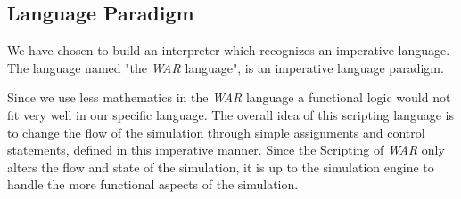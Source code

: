 \subsection{Language Paradigm}

We have chosen to build an interpreter which recognizes an imperative language. The language named "the \textit{WAR} language", is an imperative language paradigm.

Since we use less mathematics in the \textit{WAR} language a functional logic would not fit very well in our specific language. 
The overall idea of this scripting language is to change the flow of the simulation through simple assignments and control statements, defined in this imperative manner.
Since the Scripting of \textit{WAR} only alters the flow and state of the simulation, it is up to the simulation engine to handle the more functional aspects of the simulation.

